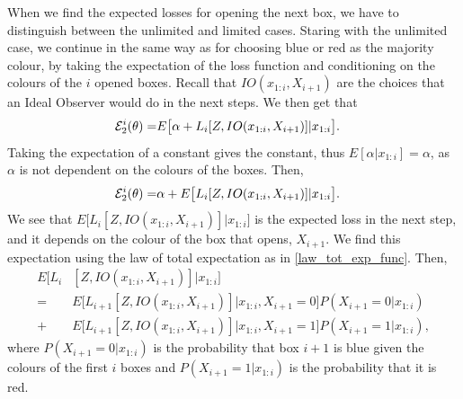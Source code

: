 When we find the expected losses for opening the next box, we have to distinguish between the unlimited and limited cases. Staring with the unlimited case, we continue in the same way as for choosing blue or red as the majority colour, by taking the expectation of the loss function and conditioning on the colours of the $i$ opened boxes. Recall that $IO(x_{1:i},X_{i+1})$ are the choices that an Ideal Observer would do in the next steps. We then get that
\begin{equation*}
    \begin{aligned}
        \mathcal{E}^i_{2}(\theta) 
        =& E \big[ \alpha + L_i[Z,IO(x_{1:i},X_{i+1})] |x_{1:i}\big].
    \end{aligned}
\end{equation*}
Taking the expectation of a constant gives the constant, thus $E[\alpha|x_{1:i}]=\alpha$, as $\alpha$ is not dependent on the colours of the boxes. Then,
\begin{equation}
\label{exp_loss_unlim_2_unfinished}
    \begin{aligned}
        \mathcal{E}^i_{2}(\theta) 
        =& \alpha + E \big[L_i[Z,IO(x_{1:i},X_{i+1})] |x_{1:i}\big].
    \end{aligned}
\end{equation}
We see that $E \big[L_i[Z,IO(x_{1:i},X_{i+1})] |x_{1:i}\big]$ is the expected loss in the next step, and it depends on the colour of the box that opens, $X_{i+1}$. We find this expectation using the law of total expectation as in \eqref{law_tot_exp_func}. Then,
\begin{equation}
\label{exp_loss_next_unlim}
    \begin{aligned}
        E \big[L_i&[Z,IO(x_{1:i},X_{i+1})] |x_{1:i}\big] \\
        =& E \big[L_{i+1}[Z,IO(x_{1:i},X_{i+1})] |x_{1:i},X_{i+1}=0\big]P(X_{i+1}=0|x_{1:i}) \\
        +& E \big[L_{i+1}[Z,IO(x_{1:i},X_{i+1})] |x_{1:i},X_{i+1}=1\big]P(X_{i+1}=1|x_{1:i}),
    \end{aligned}
\end{equation}
where $P(X_{i+1}=0|x_{1:i})$ is the probability that box $i+1$ is blue given the colours of the first $i$ boxes and $P(X_{i+1}=1|x_{1:i})$ is the probability that it is red.  




